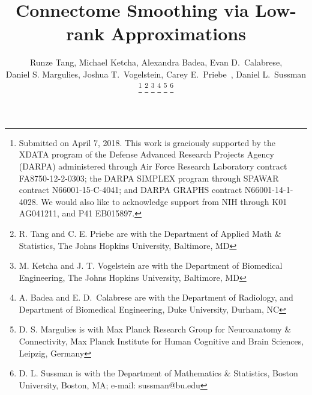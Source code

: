\documentclass[journal,twoside,web]{ieeecolor}
\date{}
\begin{document}
\title{Connectome Smoothing via Low-rank Approximations}
\author{Runze Tang,
Michael Ketcha,
Alexandra Badea, 
Evan D.~Calabrese,\\
Daniel S. Margulies,
Joshua T.~Vogelstein,
Carey E.~Priebe~,
Daniel L.~Sussman%
\thanks{
Submitted on April 7, 2018.
This work is graciously supported by the XDATA program of the Defense
Advanced Research Projects Agency (DARPA) administered through Air
Force Research Laboratory contract FA8750-12-2-0303; the DARPA SIMPLEX
program through SPAWAR contract N66001-15-C-4041; and DARPA GRAPHS
contract N66001-14-1-4028. We would also like to acknowledge support from NIH through K01 AG041211, and P41 EB015897.}
\thanks{R. Tang and C. E. Priebe are with the Department of Applied Math \& Statistics, The Johns Hopkins University, Baltimore, MD}
\thanks{M. Ketcha and J. T. Vogelstein are with the Department of Biomedical Engineering,  The Johns Hopkins University, Baltimore, MD}
\thanks{A. Badea and E. D.~Calabrese are with the Department of Radiology, and Department of Biomedical Engineering, Duke University, Durham, NC}
\thanks{D. S. Margulies is with Max Planck Research Group for Neuroanatomy \& Connectivity, Max Planck Institute for Human Cognitive and Brain Sciences, Leipzig, Germany}
\thanks{D. L. Sussman is with the Department of Mathematics \& Statistics, Boston University, Boston, MA; e-mail: sussman@bu.edu}}









\maketitle
\end{document}

